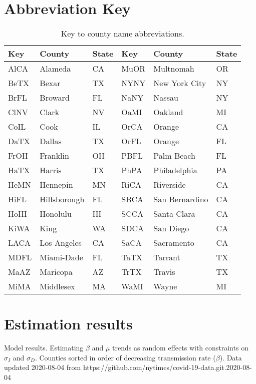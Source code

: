 \documentclass[12pt,letterpaper]{article}
\begin{document}
\appendixpage
\begin{appendices}


\section{Abbreviation Key}

\begin{table}[h!]
\caption{\label{tab:namekey}
Key to county name abbreviations.
}
\centering
\begin{tabular}{lll||lll}
\hline
Key&County&State&Key&County&State\\
\hline
AlCA&Alameda&CA&MuOR&Multnomah&OR\\
BeTX&Bexar&TX&NYNY&New York City&NY\\
BrFL&Broward&FL&NaNY&Nassau&NY\\
ClNV&Clark&NV&OaMI&Oakland&MI\\
CoIL&Cook&IL&OrCA&Orange&CA\\
DaTX&Dallas&TX&OrFL&Orange&FL\\
FrOH&Franklin&OH&PBFL&Palm Beach&FL\\
HaTX&Harris&TX&PhPA&Philadelphia&PA\\
HeMN&Hennepin&MN&RiCA&Riverside&CA\\
HiFL&Hillsborough&FL&SBCA&San Bernardino&CA\\
HoHI&Honolulu&HI&SCCA&Santa Clara&CA\\
KiWA&King&WA&SDCA&San Diego&CA\\
LACA&Los Angeles&CA&SaCA&Sacramento&CA\\
MDFL&Miami-Dade&FL&TaTX&Tarrant&TX\\
MaAZ&Maricopa&AZ&TrTX&Travis&TX\\
MiMA&Middlesex&MA&WaMI&Wayne&MI\\
\hline
\end{tabular}

\end{table}
\clearpage

\section{Estimation results}

\begin{sidewaystable}
\caption{\label{tab:cons}
Model results. Estimating $\beta$ and $\mu$ trends as random effects with 
constraints on  $\sigma_I$ and $\sigma_D$. 
Counties sorted in order of decreasing transmission rate ($\beta$).
Data updated 2020-08-04 from https://github.com/nytimes/covid-19-data.git.2020-08-04
}
\centering
{\scriptsize


}
\end{sidewaystable}
\end{appendices}
\end{document}

